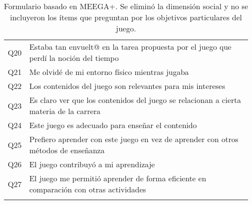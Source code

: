 \begin{table}[]
\begin{tabular}{|c|l|}
Q20      & Estaba tan envuelt@ en la tarea propuesta por el juego que perdí la noción del tiempo \\
Q21      & Me olvidé de mi entorno físico mientras jugaba \\
Q22      & Los contenidos del juego son relevantes para mis intereses \\
Q23      & Es claro ver que los contenidos del juego se relacionan a cierta materia de la carrera \\
Q24      & Este juego es adecuado para enseñar el contenido \\
Q25      & Prefiero aprender con este juego en vez de aprender con otros métodos de enseñanza \\
Q26      & El juego contribuyó a mi aprendizaje \\
Q27      & El juego me permitió aprender de forma eficiente en comparación con otras actividades \\
\hline
\caption{Formulario basado en MEEGA+. Se eliminó la dimensión social y no se incluyeron los ítems que preguntan por los objetivos particulares del juego.}
\end{tabular}
\end{table}
